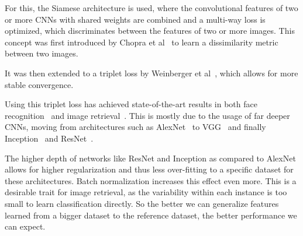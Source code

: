 \documentclass[fleqn]{article}
\begin{document}
For this, the Siamese architecture is used, where the convolutional
features of two or more CNNs with shared weights are combined and a
multi-way loss is optimized, which discriminates between the features
of two or more images.
This concept was first introduced by
Chopra et al~\cite{chopra_learning_2005} to learn a dissimilarity metric
between two images.

It was then extended to a triplet loss by
Weinberger et al~\cite{weinberger_distance_2006}, which allows for
more stable convergence.

Using this triplet loss has achieved state-of-the-art results in both
face recognition~\cite{schroff_facenet:_2015} and
image retrieval~\cite{gordo_deep_2016}. This is mostly due to the usage
of far deeper CNNs, moving from architectures such as
AlexNet~\cite{krizhevsky_imagenet_2012} to VGG~\cite{simonyan_very_2014}
and finally Inception~\cite{szegedy_inception-v4_2016} and
ResNet~\cite{he_deep_2015}.

The higher depth of networks like ResNet and Inception as compared to
AlexNet allows for higher regularization and thus less over-fitting
to a specific dataset for these architectures. Batch normalization
increases this effect even more. This is a desirable trait for image
retrieval, as the variability within each instance is too small to
learn classification directly. So the better we can generalize
features learned from a bigger dataset to the reference dataset,
the better performance we can expect.
\end{document}
